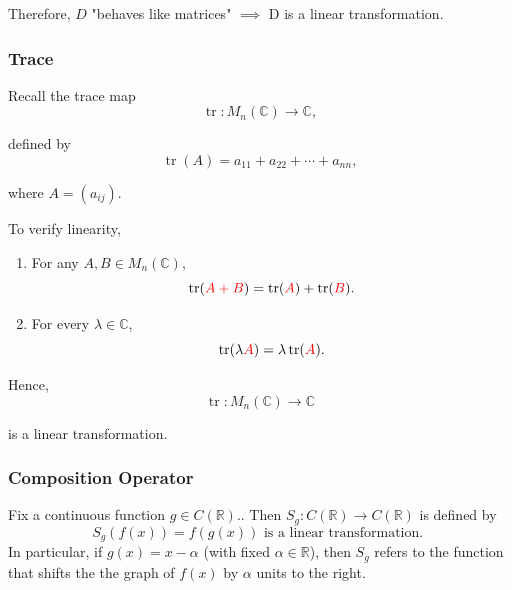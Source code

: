 \documentclass[12pt]{article}
\begin{document}
Therefore, $D$ "behaves like matrices" $\implies$ D is a linear transformation.

\newpage

\subsubsection{Trace}

Recall the trace map
\[
\operatorname{tr}:M_n(\mathbb{C})\rightarrow\mathbb{C},
\]

defined by
\[
\operatorname{tr}(A)=a_{11}+a_{22}+\cdots+a_{nn},
\]

where $A=(a_{ij}).$

\medskip

To verify linearity,
\begin{enumerate}
    \item For any $A,B\in M_n(\mathbb{C})$,
    \[
    \operatorname{tr}(\textcolor{red}{A+B}) = \operatorname{tr}(\textcolor{red}{A}) + \operatorname{tr}(\textcolor{red}{B}).
    \]

    \item For every $\lambda\in\mathbb{C}$,
    \[
    \operatorname{tr}(\lambda \textcolor{red}{A}) = \lambda\operatorname{tr}(\textcolor{red}{A}).
    \]
\end{enumerate}

Hence,
\[
\operatorname{tr}:M_n(\mathbb{C})\rightarrow\mathbb{C}
\]

is a linear transformation.

\subsubsection{Composition Operator}

Fix a continuous function $g\in C(\mathbb{R}).$. Then $S_g:C(\mathbb{R})\rightarrow C(\mathbb{R})$ is defined by
\[
S_g(f(x)) = f(g(x)) \text{ is a linear transformation. }
\]
In particular, if $g(x)=x-\alpha$ (with fixed $\alpha \in \mathbb{R}$), then $S_g$ refers to the function
that shifts the the graph of $f(x)$ by $\alpha$ units to the right.
\end{document}
